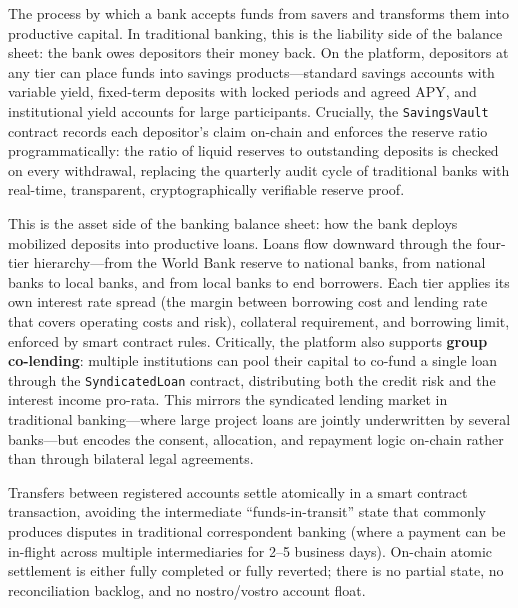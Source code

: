\documentclass[12pt,a4paper]{report}
\begin{document}
\begin{description}[leftmargin=0pt]
\item[\textbf{Deposit Mobilization.}] The process by which a bank accepts funds from savers and transforms them into productive capital. In traditional banking, this is the liability side of the balance sheet: the bank owes depositors their money back. On the platform, depositors at any tier can place funds into savings products---standard savings accounts with variable yield, fixed-term deposits with locked periods and agreed APY, and institutional yield accounts for large participants. Crucially, the \texttt{SavingsVault} contract records each depositor's claim on-chain and enforces the reserve ratio programmatically: the ratio of liquid reserves to outstanding deposits is checked on every withdrawal, replacing the quarterly audit cycle of traditional banks with real-time, transparent, cryptographically verifiable reserve proof.

\item[\textbf{Credit Allocation.}] This is the asset side of the banking balance sheet: how the bank deploys mobilized deposits into productive loans. Loans flow downward through the four-tier hierarchy---from the World Bank reserve to national banks, from national banks to local banks, and from local banks to end borrowers. Each tier applies its own interest rate spread (the margin between borrowing cost and lending rate that covers operating costs and risk), collateral requirement, and borrowing limit, enforced by smart contract rules. Critically, the platform also supports \textbf{group co-lending}: multiple institutions can pool their capital to co-fund a single loan through the \texttt{SyndicatedLoan} contract, distributing both the credit risk and the interest income pro-rata. This mirrors the syndicated lending market in traditional banking---where large project loans are jointly underwritten by several banks---but encodes the consent, allocation, and repayment logic on-chain rather than through bilateral legal agreements.

\item[\textbf{Payment and Settlement.}] Transfers between registered accounts settle atomically in a smart contract transaction, avoiding the intermediate ``funds-in-transit'' state that commonly produces disputes in traditional correspondent banking (where a payment can be in-flight across multiple intermediaries for 2--5 business days). On-chain atomic settlement is either fully completed or fully reverted; there is no partial state, no reconciliation backlog, and no nostro/vostro account float.


\end{description}
\end{document}
